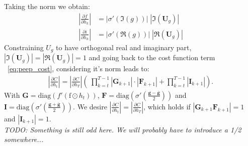 \documentclass{article}
\begin{document}
Taking the norm we obtain:
\begin{align}
|\frac{\partial f}{\partial h_k}| &= | \sigma'(\Im(g))| \; |\Im(\mathbf{U}_g)| \\
|\frac{\partial i}{\partial h_k}| &= | \sigma'(\Re(g))| \; |\Re(\mathbf{U}_g)|
\end{align}
Constraining $U_g$ to have orthogonal real and imaginary part, $|\Im(\mathbf{U}_g)| = |\Re(\mathbf{U}_g)| = 1$ and going back to the cost function term ~\ref{eq:peep_cost}, considering it's norm leads to:
\begin{align}
|\frac{\partial C}{\partial h_t}| = |\frac{\partial C}{\partial h_T}| (\:  \prod_{k=t}^{T-1} 
                                  |\mathbf{G}_{k+1}| \cdot |\mathbf{F}_{k+1}| + \prod_{k=t}^{T-1}
                                  |\mathbf{I}_{k+1}|).
\end{align}
With $\mathbf{G} = \text{diag} (f'(\text{f} \odot h_t))$, $\mathbf{F} = \text{diag}(\sigma'(\frac{\mathbf{g} - \overline{\mathbf{g}}}{2}))$ and $\mathbf{I} = \text{diag}(\sigma'(\frac{\mathbf{g} + \overline{\mathbf{g}}}{2}))$. We desire $|\frac{\partial C}{\partial h_t}| = |\frac{\partial C}{\partial h_T}|$, which holds if $|\mathbf{G}_{k+1} \mathbf{F}_{k+1}| = 1 $ and $|\mathbf{I}_{k+1}| = 1$. \\
\textit{TODO: Something is still odd here. We will probably have to introduce a 1/2 somewhere...}
\end{document}
